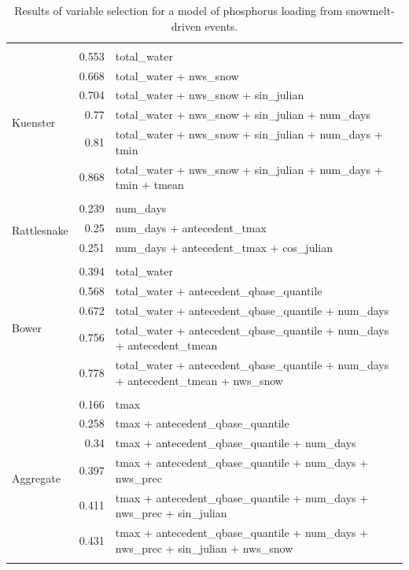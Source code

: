 \documentclass[10pt]{article}
\begin{document}
\begin{table}[h]
\begin{center}
\begin{tabular}{lrl}
\vspace{2mm}\\ \multirow{7}{*}{Kuenster} & 0.553 & total\_water\\ 
 & 0.668 & total\_water + nws\_snow\\ 
 & 0.704 & total\_water + nws\_snow + sin\_julian\\ 
 & 0.77 & total\_water + nws\_snow + sin\_julian + num\_days\\ 
 & 0.81 & total\_water + nws\_snow + sin\_julian + num\_days + tmin\\ 
 & 0.868 & total\_water + nws\_snow + sin\_julian + num\_days + tmin + tmean\\ 
\vspace{2mm}\\ \multirow{4}{*}{Rattlesnake} & 0.239 & num\_days\\ 
 & 0.25 & num\_days + antecedent\_tmax\\ 
 & 0.251 & num\_days + antecedent\_tmax + cos\_julian\\ 
\vspace{2mm}\\ \multirow{6}{*}{Bower} & 0.394 & total\_water\\ 
 & 0.568 & total\_water + antecedent\_qbase\_quantile\\ 
 & 0.672 & total\_water + antecedent\_qbase\_quantile + num\_days\\ 
 & 0.756 & total\_water + antecedent\_qbase\_quantile + num\_days + antecedent\_tmean\\ 
 & 0.778 & total\_water + antecedent\_qbase\_quantile + num\_days + antecedent\_tmean + nws\_snow\\ 
\vspace{2mm}\\ \multirow{7}{*}{Aggregate} & 0.166 & tmax\\ 
 & 0.258 & tmax + antecedent\_qbase\_quantile\\ 
 & 0.34 & tmax + antecedent\_qbase\_quantile + num\_days\\ 
 & 0.397 & tmax + antecedent\_qbase\_quantile + num\_days + nws\_prec\\ 
 & 0.411 & tmax + antecedent\_qbase\_quantile + num\_days + nws\_prec + sin\_julian\\ 
 & 0.431 & tmax + antecedent\_qbase\_quantile + num\_days + nws\_prec + sin\_julian + nws\_snow\\ 
\vspace{2mm}\\     \end{tabular}
    \caption{Results of variable selection for a model of phosphorus loading from snowmelt-driven events.\label{phos_r_square_snow}}
    \end{center}
\end{table}
\end{document}
